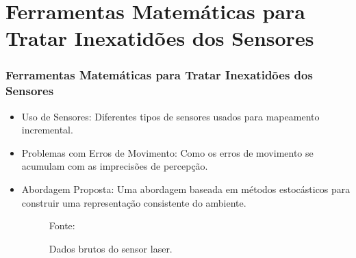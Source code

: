 \documentclass[xcolor=dvipsnames, aspectratio=169]{beamer}
\begin{document}
\section{Ferramentas Matemáticas para Tratar Inexatidões dos Sensores}
  \begin{frame}
  \frametitle{Ferramentas Matemáticas para Tratar Inexatidões dos Sensores}
  \begin{itemize}
      \item Uso de Sensores: Diferentes tipos de sensores usados para mapeamento incremental.
      \item Problemas com Erros de Movimento: Como os erros de movimento se acumulam com as imprecisões de percepção.
      \item Abordagem Proposta: Uma abordagem baseada em métodos estocásticos para construir uma representação consistente do ambiente.
      \begin{figure}
        \centering
        {Fonte: \cite{buniyamin2011simple}}
        \caption{Dados brutos do sensor laser.}
        \label{fig:1_range_sensor_obstacle}
      \end{figure}
  \end{itemize}
\end{frame}
  
\end{document}
